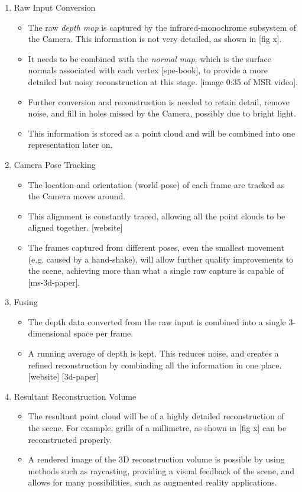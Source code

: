 \documentclass[11pt,openright,a4paper]{report}
\begin{document}
\begin{enumerate}
  \item Raw Input Conversion
    \begin{itemize}
      \item The raw \textit{depth map} is captured by the infrared-monochrome subsystem of the Camera. This information is not very detailed, as shown in [fig x].  
      \item It needs to be combined with the \textit{normal map}, which is the surface normals associated with each vertex [spe-book], to provide a more detailed but noisy reconstruction at this stage. [image 0:35 of MSR video]. 
      \item Further conversion and reconstruction is needed to retain detail, remove noise, and fill in holes missed by the Camera, possibly due to bright light.
      \item This information is stored as a point cloud and will be combined into one representation later on.
    \end{itemize}

  \item Camera Pose Tracking
    \begin{itemize}
      \item The location and orientation (world pose) of each frame are tracked as the Camera moves around.
      \item This alignment is constantly traced, allowing all the point clouds to be aligned together. [website]
      \item The frames captured from different poses, even the smallest movement (e.g. caused by a hand-shake), will allow further quality improvements to the scene, achieving more than what a single raw capture is capable of [ms-3d-paper].
    \end{itemize}

  \item Fusing 
    \begin{itemize}
      \item The depth data converted from the raw input is combined into a single 3-dimensional space per frame.
      \item A running average of depth is kept. This reduces noise, and creates a refined reconstruction by combinding all the information in one place. [website] [3d-paper]
    \end{itemize}

  \item Resultant Reconstruction Volume
    \begin{itemize}
      \item The resultant point cloud will be of a highly detailed reconstruction of the scene. For example, grills of a millimetre, as shown in [fig x] can be reconstructed properly.
      \item A rendered image of the 3D reconstruction volume is possible by using methods such as raycasting, providing a visual feedback of the scene, and allows for many possibilities, such as augmented reality applications.
    \end{itemize}
\end{enumerate}
\end{document}
